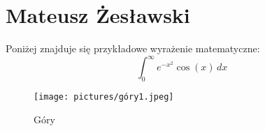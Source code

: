 

\section{Mateusz Żesławski}
\label{sec:mzeslawski}

Poniżej znajduje się przykładowe wyrażenie matematyczne:
\[ \int_{0}^{\infty} e^{-x^2} \cos(x) \, dx \]


\begin{figure}[h]
    \centering
    \texttt{[image: pictures/góry1.jpeg]}
    \caption{Góry}
    \label{fig:zdjecie}
\end{figure}





